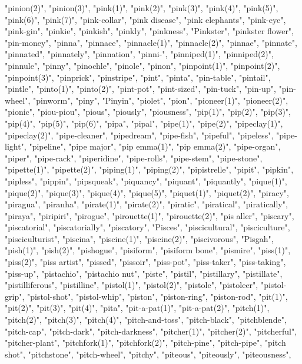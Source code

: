 "pinion(2)",
"pinion(3)",
"pink(1)",
"pink(2)",
"pink(3)",
"pink(4)",
"pink(5)",
"pink(6)",
"pink(7)",
"pink-collar",
"pink disease",
"pink elephants",
"pink-eye",
"pink-gin",
"pinkie",
"pinkish",
"pinkly",
"pinkness",
"Pinkster",
"pinkster flower",
"pin-money",
"pinna",
"pinnace",
"pinnacle(1)",
"pinnacle(2)",
"pinnae",
"pinnate",
"pinnated",
"pinnately",
"pinnation",
"pinni-",
"pinniped(1)",
"pinniped(2)",
"pinnule",
"pinny",
"pinochle",
"pinole",
"pinon",
"pinpoint(1)",
"pinpoint(2)",
"pinpoint(3)",
"pinprick",
"pinstripe",
"pint",
"pinta",
"pin-table",
"pintail",
"pintle",
"pinto(1)",
"pinto(2)",
"pint-pot",
"pint-sized",
"pin-tuck",
"pin-up",
"pin-wheel",
"pinworm",
"piny",
"Pinyin",
"piolet",
"pion",
"pioneer(1)",
"pioneer(2)",
"pionic",
"piou-piou",
"pious",
"piously",
"piousness",
"pip(1)",
"pip(2)",
"pip(3)",
"pip(4)",
"pip(5)",
"pip(6)",
"pipa",
"pipal",
"pipe(1)",
"pipe(2)",
"pipeclay(1)",
"pipeclay(2)",
"pipe-cleaner",
"pipedream",
"pipe-fish",
"pipeful",
"pipeless",
"pipe-light",
"pipeline",
"pipe major",
"pip emma(1)",
"pip emma(2)",
"pipe-organ",
"piper",
"pipe-rack",
"piperidine",
"pipe-rolls",
"pipe-stem",
"pipe-stone",
"pipette(1)",
"pipette(2)",
"piping(1)",
"piping(2)",
"pipistrelle",
"pipit",
"pipkin",
"pipless",
"pippin",
"pipsqueak",
"piquancy",
"piquant",
"piquantly",
"pique(1)",
"pique(2)",
"pique(3)",
"pique(4)",
"pique(5)",
"piquet(1)",
"piquet(2)",
"piracy",
"piragua",
"piranha",
"pirate(1)",
"pirate(2)",
"piratic",
"piratical",
"piratically",
"piraya",
"piripiri",
"pirogue",
"pirouette(1)",
"pirouette(2)",
"pis aller",
"piscary",
"piscatorial",
"piscatorially",
"piscatory",
"Pisces",
"piscicultural",
"pisciculture",
"pisciculturist",
"piscina",
"piscine(1)",
"piscine(2)",
"piscivorous",
"Pisgah",
"pish(1)",
"pish(2)",
"pishogue",
"pisiform",
"pisiform bone",
"pismire",
"piss(1)",
"piss(2)",
"piss artist",
"pissed",
"pissoir",
"piss-pot",
"piss-taker",
"piss-taking",
"piss-up",
"pistachio",
"pistachio nut",
"piste",
"pistil",
"pistillary",
"pistillate",
"pistilliferous",
"pistilline",
"pistol(1)",
"pistol(2)",
"pistole",
"pistoleer",
"pistol-grip",
"pistol-shot",
"pistol-whip",
"piston",
"piston-ring",
"piston-rod",
"pit(1)",
"pit(2)",
"pit(3)",
"pit(4)",
"pita",
"pit-a-pat(1)",
"pit-a-pat(2)",
"pitch(1)",
"pitch(2)",
"pitch(3)",
"pitch(4)",
"pitch-and-toss",
"pitch-black",
"pitchblende",
"pitch-cap",
"pitch-dark",
"pitch-darkness",
"pitcher(1)",
"pitcher(2)",
"pitcherful",
"pitcher-plant",
"pitchfork(1)",
"pitchfork(2)",
"pitch-pine",
"pitch-pipe",
"pitch shot",
"pitchstone",
"pitch-wheel",
"pitchy",
"piteous",
"piteously",
"piteousness",
